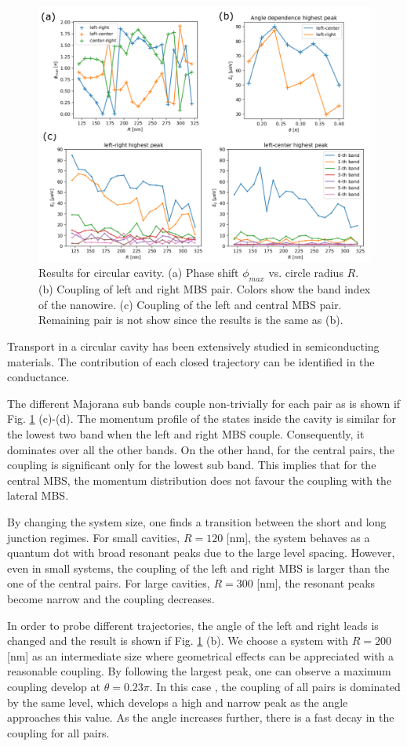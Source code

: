 \begin{figure}[h!]
\centering
  \includegraphics[width=0.8\linewidth]{figures/circle_results.pdf}
  \caption{Results for circular cavity. (a) Phase shift $\phi_{max}$ vs. circle radius $R$. (b) Coupling of left and right MBS pair. Colors show the band index of the nanowire. (c) Coupling of the left and central MBS pair. Remaining pair is not show since the results is the same as (b).}
  \label{fig:circle_results}
\end{figure}

Transport in a circular cavity has been extensively studied in semiconducting materials.
The contribution of each closed trajectory can be identified in the conductance.

The different Majorana sub bands couple non-trivially for each pair as is shown if Fig. \ref{fig:circle_results} (c)-(d).
The momentum profile of the states inside the cavity is similar for the lowest two band when the left and right MBS couple.
Consequently, it dominates over all the other bands.
On the other hand, for the central pairs, the coupling is significant only for the lowest sub band.
This implies that for the central MBS, the momentum distribution does not favour the coupling with the lateral MBS.

By changing the system size, one finds a transition between the short and long junction regimes.
For small cavities, $R=120$ [nm], the system behaves as a quantum dot with broad resonant peaks due to the large level spacing.
However, even in small systems, the coupling of the left and right MBS is larger than the one of the central pairs.
For large cavities, $R=300$ [nm], the resonant peaks become narrow and the coupling decreases.

In order to probe different trajectories, the angle of the left and right leads is changed and the result is shown if Fig. \ref{fig:circle_results} (b).
We choose a system with $R=200$ [nm] as an intermediate size where geometrical effects can be appreciated with a reasonable coupling.
By following the largest peak, one can observe a maximum coupling develop at $\theta = 0.23 \pi$.
In this case , the coupling of all pairs is dominated by the same level, which develops a high and narrow peak as the angle approaches this value.
As the angle increases further, there is a fast decay in the coupling for all pairs.

